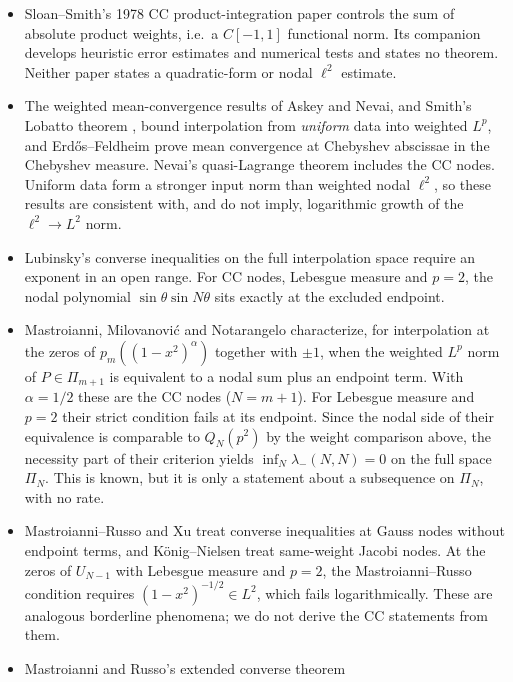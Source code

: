 \documentclass{siamart251216}
\newcommand{\Pn}{\Pi}
\begin{document}
\begin{itemize}
\item Sloan--Smith's 1978 CC product-integration paper \cite{LIT-047}
controls the sum of absolute product weights, i.e.\ a $C[-1,1]$ functional
norm. Its companion \cite{LIT-048} develops heuristic error estimates and
numerical tests and states no theorem. Neither paper states a
quadratic-form or nodal $\ell^2$ estimate.
\item The weighted mean-convergence results of Askey and Nevai, and Smith's
Lobatto theorem \cite{LIT-062,LIT-063,LIT-065}, bound interpolation from
\emph{uniform} data into weighted $L^p$, and Erd\H{o}s--Feldheim
\cite{LIT-061} prove mean convergence at Chebyshev abscissae in the
Chebyshev measure. Nevai's quasi-Lagrange theorem
\cite[Thm.~6]{LIT-063} includes the CC nodes. Uniform data form a stronger input norm than
weighted nodal $\ell^2$, so these results are consistent with, and do not
imply, logarithmic growth of the $\ell^2\to L^2$ norm.
\item Lubinsky's converse inequalities on the full interpolation space
\cite{LIT-064} require an exponent in an open range. For CC nodes,
Lebesgue measure and $p=2$, the nodal polynomial
$\sin\theta\sin N\theta$ sits exactly at the excluded endpoint.
\item Mastroianni, Milovanovi\'c and Notarangelo \cite{LIT-299}
characterize, for interpolation at the zeros of $p_m((1-x^2)^\alpha)$
together with $\pm1$, when the weighted $L^p$ norm of $P\in\Pn_{m+1}$ is
equivalent to a nodal sum plus an endpoint term. With $\alpha=1/2$ these
are the CC nodes ($N=m+1$). For Lebesgue measure and $p=2$ their strict
condition fails at its endpoint. Since the nodal side of their equivalence
is comparable to $Q_N(p^2)$ by the weight comparison above, the necessity
part of their criterion yields $\inf_N\lambda_-(N,N)=0$ on the full space
$\Pn_N$. This is known, but it is only a statement about a
subsequence on $\Pn_N$, with no rate.
\item Mastroianni--Russo \cite{LIT-293} and Xu \cite{LIT-296} treat
converse inequalities at Gauss nodes without endpoint terms, and
K\"onig--Nielsen \cite{LIT-294} treat same-weight Jacobi nodes. At the
zeros of $U_{N-1}$ with Lebesgue measure and $p=2$, the Mastroianni--Russo
condition requires $(1-x^2)^{-1/2}\in L^2$, which fails logarithmically.
These are analogous borderline phenomena; we do not derive the CC
statements from them.
\item Mastroianni and Russo's extended converse theorem \cite[Thm.~11]{LIT-511}

\end{itemize}
\end{document}
